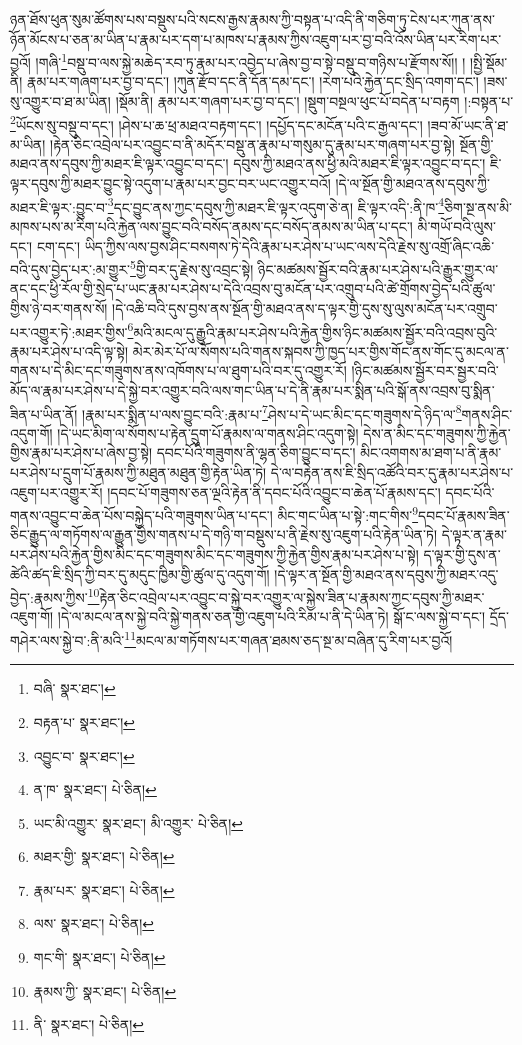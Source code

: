 ཉན་ཐོས་ཕུན་སུམ་ཚོགས་པས་བསྡུས་པའི་སངས་རྒྱས་རྣམས་ཀྱི་བསྟན་པ་འདི་ནི་གཅིག་ཏུ་ངེས་པར་ཀུན་ནས་ཉོན་མོངས་པ་ཅན་མ་ཡིན་པ་རྣམ་པར་དག་པ་མཁས་པ་རྣམས་ཀྱིས་འཇུག་པར་བྱ་བའི་འོས་ཡིན་པར་རིག་པར་བྱའོ། །གཞི་\footnote{བཞི་  སྣར་ཐང་། }བསྡུ་བ་ལས་སྐྱེ་མཆེད་རབ་ཏུ་རྣམ་པར་འབྱེད་པ་ཞེས་བྱ་བ་སྟེ་བསྡུ་བ་གཉིས་པ་རྫོགས་སོ།། །
།སྤྱི་སྡོམ་ནི། རྣམ་པར་གཞག་པར་བྱ་བ་དང་། །ཀུན་རྫོབ་དང་ནི་དོན་དམ་དང་། །རེག་པའི་རྐྱེན་དང་སྲིད་འགག་དང་། །ཟས་སུ་འགྱུར་བ་ཐ་མ་ཡིན། །སྡོམ་ནི། རྣམ་པར་གཞག་པར་བྱ་བ་དང་། །སྡུག་བསྔལ་ཕུང་པོ་བདེན་པ་བརྟག །:བསྟན་པ་\footnote{བརྟན་པ་  སྣར་ཐང་། }ཡོངས་སུ་བསྡུ་བ་དང་། །ཤེས་པ་ཆ་ཕྲ་མཐའ་བརྟག་དང་། །དཔྱོད་དང་མངོན་པའི་ང་རྒྱལ་དང་། །ཟབ་མོ་ཡང་ནི་ཐ་མ་ཡིན། །རྟེན་ཅིང་འབྲེལ་པར་འབྱུང་བ་ནི་མདོར་བསྡུ་ན་རྣམ་པ་གསུམ་དུ་རྣམ་པར་གཞག་པར་བྱ་སྟེ། སྔོན་གྱི་མཐའ་ནས་དབུས་ཀྱི་མཐར་ཇི་ལྟར་འབྱུང་བ་དང་། དབུས་ཀྱི་མཐའ་ནས་ཕྱི་མའི་མཐར་ཇི་ལྟར་འབྱུང་བ་དང་། ཇི་ལྟར་དབུས་ཀྱི་མཐར་བྱུང་སྟེ་འདུག་པ་རྣམ་པར་བྱང་བར་ཡང་འགྱུར་བའོ། །དེ་ལ་སྔོན་གྱི་མཐའ་ནས་དབུས་ཀྱི་མཐར་ཇི་ལྟར་:བྱུང་བ་\footnote{འབྱུང་བ་  སྣར་ཐང་། }དང་བྱུང་ནས་ཀྱང་དབུས་ཀྱི་མཐར་ཇི་ལྟར་འདུག་ཅེ་ན། ཇི་ལྟར་འདི་:ནི་ཁ་\footnote{ན་ཁ་  སྣར་ཐང་།  པེ་ཅིན། }ཅིག་སྔ་ནས་མི་མཁས་པས་མ་རིག་པའི་རྐྱེན་ལས་བྱུང་བའི་བསོད་ནམས་དང་བསོད་ནམས་མ་ཡིན་པ་དང་། མི་གཡོ་བའི་ལུས་དང་། ངག་དང་། ཡིད་ཀྱིས་ལས་བྱས་ཤིང་བསགས་ཏེ་དེའི་རྣམ་པར་ཤེས་པ་ཡང་ལས་དེའི་རྗེས་སུ་འགྲོ་ཞིང་འཆི་བའི་དུས་བྱེད་པར་:མ་གྱུར་\footnote{ཡང་མི་འགྱུར་  སྣར་ཐང་། མི་འགྱུར་  པེ་ཅིན། }གྱི་བར་དུ་རྗེས་སུ་འབྲང་སྟེ། ཉིང་མཚམས་སྦྱོར་བའི་རྣམ་པར་ཤེས་པའི་རྒྱུར་གྱུར་ལ་ནང་དང་ཕྱི་རོལ་གྱི་སྲེད་པ་ཡང་རྣམ་པར་ཤེས་པ་དེའི་འབྲས་བུ་མངོན་པར་འགྲུབ་པའི་ཚེ་གྲོགས་བྱེད་པའི་ཚུལ་གྱིས་ཉེ་བར་གནས་སོ། །དེ་འཆི་བའི་དུས་བྱས་ནས་སྔོན་གྱི་མཐའ་ནས་ད་ལྟར་གྱི་དུས་སུ་ལུས་མངོན་པར་འགྲུབ་པར་འགྱུར་ཏེ་:མཐར་གྱིས་\footnote{མཐར་གྱི་  སྣར་ཐང་།  པེ་ཅིན། }མའི་མངལ་དུ་རྒྱུའི་རྣམ་པར་ཤེས་པའི་རྐྱེན་གྱིས་ཉིང་མཚམས་སྦྱོར་བའི་འབྲས་བུའི་རྣམ་པར་ཤེས་པ་འདི་ལྟ་སྟེ། མེར་མེར་པོ་ལ་སོགས་པའི་གནས་སྐབས་ཀྱི་ཁྱད་པར་གྱིས་གོང་ནས་གོང་དུ་མངལ་ན་གནས་པ་དེ་མིང་དང་གཟུགས་ནས་འཁོགས་པ་ལ་ཐུག་པའི་བར་དུ་འགྱུར་རོ། །ཉིང་མཚམས་སྦྱོར་བར་སྦྱར་བའི་མོད་ལ་རྣམ་པར་ཤེས་པ་དེ་སྐྱེ་བར་འགྱུར་བའི་ལས་གང་ཡིན་པ་དེ་ནི་རྣམ་པར་སྨིན་པའི་སྒོ་ནས་འབྲས་བུ་སྨིན་ཟིན་པ་ཡིན་ནོ། །རྣམ་པར་སྨིན་པ་ལས་བྱུང་བའི་:རྣམ་པ་\footnote{རྣམ་པར་  སྣར་ཐང་།  པེ་ཅིན། }ཤེས་པ་དེ་ཡང་མིང་དང་གཟུགས་དེ་ཉིད་ལ་\footnote{ལས་  སྣར་ཐང་།  པེ་ཅིན། }གནས་ཤིང་འདུག་གོ། །དེ་ཡང་མིག་ལ་སོགས་པ་རྟེན་དྲུག་པོ་རྣམས་ལ་གནས་ཤིང་འདུག་སྟེ། དེས་ན་མིང་དང་གཟུགས་ཀྱི་རྐྱེན་གྱིས་རྣམ་པར་ཤེས་པ་ཞེས་བྱ་སྟེ། དབང་པོའི་གཟུགས་ནི་ལྷན་ཅིག་བྱུང་བ་དང་། མིང་འགགས་མ་ཐག་པ་ནི་རྣམ་པར་ཤེས་པ་དྲུག་པོ་རྣམས་ཀྱི་མཐུན་མཐུན་གྱི་རྟེན་ཡིན་ཏེ། དེ་ལ་བརྟེན་ནས་ཇི་སྲིད་འཚོའི་བར་དུ་རྣམ་པར་ཤེས་པ་འཇུག་པར་འགྱུར་རོ། །དབང་པོ་གཟུགས་ཅན་ལྔའི་རྟེན་ནི་དབང་པོའི་འབྱུང་བ་ཆེན་པོ་རྣམས་དང་། དབང་པོའི་གནས་འབྱུང་བ་ཆེན་པོས་བསྐྱེད་པའི་གཟུགས་ཡིན་པ་དང་། མིང་གང་ཡིན་པ་སྟེ་:གང་གིས་\footnote{གང་གི་  སྣར་ཐང་།  པེ་ཅིན། }དབང་པོ་རྣམས་ཟིན་ཅིང་རྒྱུད་ལ་གཏོགས་ལ་རྒྱུན་གྱིས་གནས་པ་དེ་གཉི་ག་བསྡུས་པ་ནི་རྗེས་སུ་འཇུག་པའི་རྟེན་ཡིན་ཏེ། དེ་ལྟར་ན་རྣམ་པར་ཤེས་པའི་རྐྱེན་གྱིས་མིང་དང་གཟུགས་མིང་དང་གཟུགས་ཀྱི་རྐྱེན་གྱིས་རྣམ་པར་ཤེས་པ་སྟེ། ད་ལྟར་གྱི་དུས་ན་ཚེའི་ཚད་ཇི་སྲིད་ཀྱི་བར་དུ་མདུང་ཁྱིམ་གྱི་ཚུལ་དུ་འདུག་གོ། །དེ་ལྟར་ན་སྔོན་གྱི་མཐའ་ནས་དབུས་ཀྱི་མཐར་འདུ་བྱེད་:རྣམས་ཀྱིས་\footnote{རྣམས་ཀྱི་  སྣར་ཐང་།  པེ་ཅིན། }རྟེན་ཅིང་འབྲེལ་པར་འབྱུང་བ་སྐྱེ་བར་འགྱུར་ལ་སྐྱེས་ཟིན་པ་རྣམས་ཀྱང་དབུས་ཀྱི་མཐར་འཇུག་གོ། །དེ་ལ་མངལ་ནས་སྐྱེ་བའི་སྐྱེ་གནས་ཅན་གྱི་འཇུག་པའི་རིམ་པ་ནི་དེ་ཡིན་ཏེ། སྒོ་ང་ལས་སྐྱེ་བ་དང་། དྲོད་གཤེར་ལས་སྐྱེ་བ་:ནི་མའི་\footnote{ནི་  སྣར་ཐང་།  པེ་ཅིན། }མངལ་མ་གཏོགས་པར་གཞན་ཐམས་ཅད་སྔ་མ་བཞིན་དུ་རིག་པར་བྱའོ། 